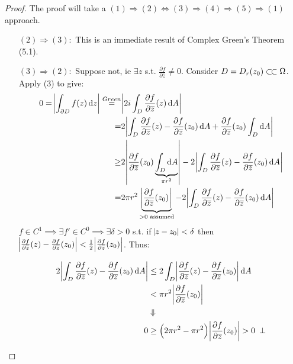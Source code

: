 \begin{proof}
The proof will take a $(1) \Rightarrow (2) \Leftrightarrow (3) \Rightarrow (4) \Rightarrow (5) \Rightarrow (1)$ approach.

\begin{enumerate}
    \item[$(2)\Rightarrow (3):$] This is an immediate result of Complex Green's Theorem (5.1).
    \item[$(3)\Rightarrow (2):$] Suppose not, ie $\exists z$ s.t. $\frac{\partial f}{\partial \overline{z}} \neq 0$. Consider $D= D_r(z_0)\ssubset \Omega$. Apply (3) to give:
    \begin{align*}
        0 = \abs{\int_{\partial D} f(z)  \dif z} \overset{Green}{=}& \abs{2i \int_D \frac{\partial f}{\partial \overline{z}}(z)  \dif A}\\
        =& 2\abs{\int_D \frac{\partial f}{\partial \overline{z}}(z) - \frac{\partial f}{\partial \overline{z}}(z_0)  \dif A + \frac{\partial f}{\partial \overline{z}}(z_0) \int_D \dif A }\\
        \geq&  2\abs{\frac{\partial f}{\partial \overline{z}}(z_0) \underbrace{\int_D \dif A}_{\pi r^2}}  -  2 \abs{\int_D \frac{\partial f}{\partial \overline{z}}(z) - \frac{\partial f}{\partial \overline{z}}(z_0)  \dif A}\\
        =& 2\pi r^2 \underbrace{\abs{\frac{\partial f}{\partial \overline{z}}(z_0)}}_{>0 \text{ assumed}} - 2 \abs{\int_D \frac{\partial f}{\partial \overline{z}}(z) - \frac{\partial f}{\partial \overline{z}}(z_0)  \dif A}\\
    \end{align*}
    $f\in C^1 \implies \exists f' \in C^0 \implies \exists \delta>0$ s.t. if $\abs{z-z_0}< \delta$ then $\abs{ \frac{\partial f}{\partial \overline{z}}(z) - \frac{\partial f}{\partial \overline{z}}(z_0) }< \frac{1}{2}\abs{\frac{\partial f}{\partial \overline{z}}(z_0)}$. Thus:
    
    \begin{align*}
        2 \abs{\int_D \frac{\partial f}{\partial \overline{z}}(z) - \frac{\partial f}{\partial \overline{z}}(z_0)  \dif A} &\leq 2 \int_D \abs{ \frac{\partial f}{\partial \overline{z}}(z) - \frac{\partial f}{\partial \overline{z}}(z_0)}  \dif A\\
        &< \pi r^2 \abs{\frac{\partial f}{\partial \overline{z}}(z_0)}\\
        &\Downarrow\\
        0 &\geq \left( 2\pi r^2 - \pi r^2\right) \abs{\frac{\partial f}{\partial \overline{z}}(z_0)} > 0 \, \, \, \bot
    \end{align*}
    

\end{enumerate}
\end{proof}
